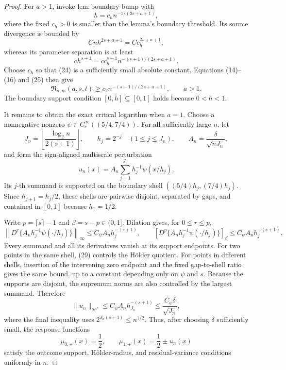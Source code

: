 \documentclass{article}
\begin{document}
\begin{proof}
For \(a>1\), invoke \(\mathrm{lem:boundary\text{-}bump}\) with
\[
 h=c_hn^{-1/(2s+a+1)},
 \tag{23}
\]
where the fixed \(c_h>0\) is smaller than the lemma's boundary threshold.  Its source divergence is bounded by
\[
 Cnh^{2s+a+1}=Cc_h^{2s+a+1},
 \tag{24}
\]
whereas its parameter separation is at least
\[
 c h^{s+1}
 =c c_h^{s+1}n^{-(s+1)/(2s+a+1)}.
 \tag{25}
\]
Choose \(c_h\) so that (24) is a sufficiently small absolute constant.  Equations (14)--(16) and (25) then give
\[
 \mathfrak R_{n,m}(a,s,t)
 \geq c_2n^{-(s+1)/(2s+a+1)},
 \qquad a>1.
 \tag{26}
\]
The boundary support condition \([0,h]\subseteq[0,1]\) holds because \(0<h<1\).

It remains to obtain the exact critical logarithm when \(a=1\).  Choose a nonnegative nonzero \(\psi\in C_c^\infty((5/4,7/4))\).  For all sufficiently large \(n\), let
\[
 J_n=\left\lfloor\frac{\log_2 n}{2(s+1)}\right\rfloor,
 \qquad h_j=2^{-j}\quad(1\leq j\leq J_n),
 \qquad A_n=\frac{\delta}{\sqrt{nJ_n}},
 \tag{27}
\]
and form the sign-aligned multiscale perturbation
\[
 u_n(x)=A_n\sum_{j=1}^{J_n}h_j^{-1}\psi(x/h_j).
 \tag{28}
\]
Its \(j\)-th summand is supported on the boundary shell \(((5/4)h_j,(7/4)h_j)\).  Since \(h_{j+1}=h_j/2\), these shells are pairwise disjoint, separated by gaps, and contained in \([0,1]\) because \(h_1=1/2\).

Write \(p=\lceil s\rceil-1\) and \(\beta=s-p\in(0,1]\).  Dilation gives, for \(0\leq r\leq p\),
\[
 \left\|D^r\{A_nh_j^{-1}\psi(\cdot/h_j)\}\right\|_\infty
 \leq C_\psi A_nh_j^{-(r+1)},
 \qquad
 \left[D^p\{A_nh_j^{-1}\psi(\cdot/h_j)\}\right]_\beta
 \leq C_\psi A_nh_j^{-(s+1)}.
 \tag{29}
\]
Every summand and all its derivatives vanish at its support endpoints.  For two points in the same shell, (29) controls the H\"older quotient.  For points in different shells, insertion of the intervening zero endpoint and the fixed gap-to-shell ratio gives the same bound, up to a constant depending only on \(\psi\) and \(s\).  Because the supports are disjoint, the supremum norms are also controlled by the largest summand.  Therefore
\[
 \|u_n\|_{\mathcal H^s}
 \leq C_\psi A_n h_{J_n}^{-(s+1)}
 \leq \frac{C_\psi\delta}{\sqrt{J_n}},
 \tag{30}
\]
where the final inequality uses \(2^{J_n(s+1)}\leq n^{1/2}\).  Thus, after choosing \(\delta\) sufficiently small, the response functions
\[
 \mu_{0,\pm}(x)=\frac12,
 \qquad
 \mu_{1,\pm}(x)=\frac12\pm u_n(x)
 \tag{31}
\]
satisfy the outcome support, H\"older-radius, and residual-variance conditions uniformly in \(n\).


\end{proof}
\end{document}
